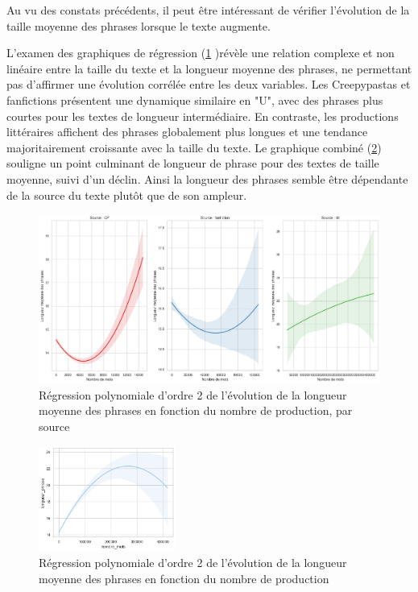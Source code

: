 \documentclass[12pt,a4paper,oneside,titlepage]{book} %
\begin{document}
Au vu des constats précédents, il peut être intéressant de vérifier l'évolution de la taille moyenne des phrases lorsque le texte augmente.  

L'examen des graphiques de régression (\ref{fig:reg2_source} )révèle une relation complexe et non linéaire entre la taille du texte et la longueur moyenne des phrases, ne permettant pas d'affirmer une évolution corrélée entre les deux variables. Les Creepypastas et fanfictions présentent une dynamique similaire en "U", avec des phrases plus courtes pour les textes de longueur intermédiaire. En contraste, les productions littéraires affichent des phrases globalement plus longues et une tendance majoritairement croissante avec la taille du texte. 
Le graphique combiné (\ref{fig:reg2_corpus}) souligne un point culminant de longueur de phrase pour des textes de taille moyenne, suivi d'un déclin. Ainsi la longueur des phrases semble être dépendante de la source du texte plutôt que de son ampleur.


		\begin{figure}[htbp]
		\centering
		\includegraphics[width = \textwidth]{illustration/reg2_phrases_mots_source.png}
		\caption{Régression polynomiale d'ordre 2 de l'évolution de la longueur moyenne des phrases en fonction du nombre de production, par source}
        \label{fig:reg2_source}
	\end{figure}


    \begin{figure}[htbp]
		\centering
		\includegraphics[width = 0.4\textwidth]{illustration/reg2_phrase_mots.png}
		\caption{Régression polynomiale d'ordre 2 de l'évolution de la longueur moyenne des phrases en fonction du nombre de production}
        \label{fig:reg2_corpus}
	\end{figure}
    
\end{document}
